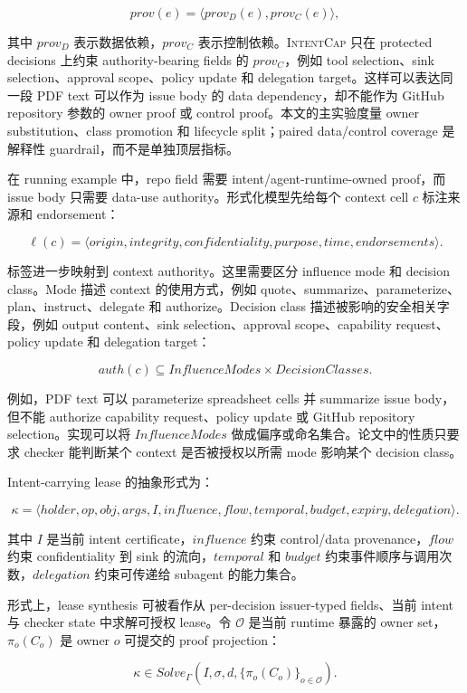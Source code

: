 \documentclass[UTF8,a4paper,11pt]{ctexart}
\newcommand{\sys}{\textsc{IntentCap}\xspace}
\begin{document}
\[
prov(e)=\langle prov_D(e), prov_C(e) \rangle ,
\]

其中 \(prov_D\) 表示数据依赖，\(prov_C\) 表示控制依赖。\sys 只在 protected decisions 上约束 authority-bearing fields 的 \(prov_C\)，例如 tool selection、sink selection、approval scope、policy update 和 delegation target。这样可以表达同一段 PDF text 可以作为 issue body 的 data dependency，却不能作为 GitHub repository 参数的 owner proof 或 control proof。本文的主实验度量 owner substitution、class promotion 和 lifecycle split；paired data/control coverage 是解释性 guardrail，而不是单独顶层指标。

在 running example 中，repo field 需要 intent/agent-runtime-owned proof，而 issue body 只需要 data-use authority。形式化模型先给每个 context cell \(c\) 标注来源和 endorsement：

\[
\ell(c)=\langle origin, integrity, confidentiality, purpose, time, endorsements\rangle .
\]

标签进一步映射到 context authority。这里需要区分 influence mode 和 decision class。Mode 描述 context 的使用方式，例如 quote、summarize、parameterize、plan、instruct、delegate 和 authorize。Decision class 描述被影响的安全相关字段，例如 output content、sink selection、approval scope、capability request、policy update 和 delegation target：

\[
auth(c) \subseteq InfluenceModes \times DecisionClasses .
\]

例如，PDF text 可以 parameterize spreadsheet cells 并 summarize issue body，但不能 authorize capability request、policy update 或 GitHub repository selection。实现可以将 \(InfluenceModes\) 做成偏序或命名集合。论文中的性质只要求 checker 能判断某个 context 是否被授权以所需 mode 影响某个 decision class。

Intent-carrying lease 的抽象形式为：

\[
\kappa =
\langle holder, op, obj, args, I, influence, flow, temporal, budget, expiry, delegation\rangle .
\]

其中 \(I\) 是当前 intent certificate，\(influence\) 约束 control/data provenance，\(flow\) 约束 confidentiality 到 sink 的流向，\(temporal\) 和 \(budget\) 约束事件顺序与调用次数，\(delegation\) 约束可传递给 subagent 的能力集合。

形式上，lease synthesis 可被看作从 per-decision issuer-typed fields、当前 intent 与 checker state 中求解可授权 lease。令 \(\mathcal{O}\) 是当前 runtime 暴露的 owner set，\(\pi_o(C_o)\) 是 owner \(o\) 可提交的 proof projection：

\[
\kappa \in Solve_\Gamma(I,\sigma,d,\{\pi_o(C_o)\}_{o\in \mathcal{O}}) .
\]
\end{document}
